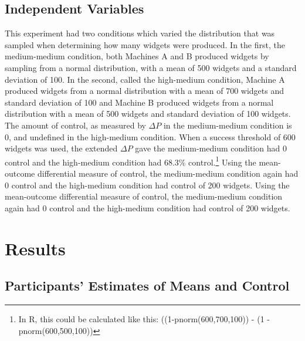 \documentclass[USenglish,letterpaper,12pt,extrafontsizes,oneside,onecolumn,final]{memoir}
\newcommand{\deltap}{$\Delta P$}
\begin{document}
\subsection{Independent Variables}

This experiment had two conditions which varied the distribution that was sampled when determining how many widgets were produced.  
In the first, the medium-medium condition, both Machines A and B produced widgets by sampling from a normal distribution, with a mean of 500 widgets and a standard deviation of 100.  In the second, called the high-medium condition, Machine A produced widgets from a normal distribution with a mean of 700 widgets and standard deviation of 100 and Machine B produced widgets from a normal distribution with a mean of 500 widgets and standard deviation of 100 widgets.  The amount of control, as measured by \deltap \xspace in the medium-medium condition is 0, and undefined in the high-medium
condition. When a success threshold of 600 widgets was used, the extended \deltap \xspace gave the medium-medium condition had 0 control and the high-medium condition had 68.3\% control.\footnote{In R, this could be calculated like this: ((1-pnorm(600,700,100)) - (1 - pnorm(600,500,100))} Using the mean-outcome differential measure of control, the medium-medium condition again had 0 control and the high-medium condition had control of 200 widgets. Using the mean-outcome differential measure of control, the medium-medium condition again had 0 control and the high-medium condition had control of 200 widgets.   

\section{Results}

\subsection{Participants' Estimates of Means and Control}
\end{document}
